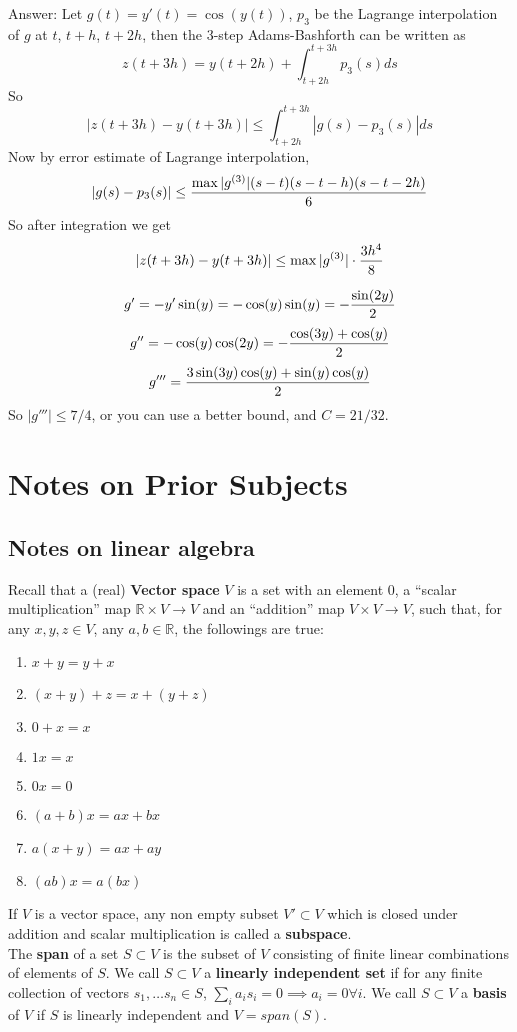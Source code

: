 \documentclass{article} %
\theoremstyle{break}
\begin{document}
Answer: Let $g(t)=y'(t)=\cos(y(t))$, $p_3$ be the Lagrange interpolation of $g$ at $t$, $t+h$, $t+2h$, then the 3-step Adams-Bashforth can be written as
\[z(t+3h)=y(t+2h)+\int_{t+2h}^{t+3h}p_3(s)ds\]
So
\[|z(t+3h)-y(t+3h)|\leq \int_{t+2h}^{t+3h}|g(s)-p_3(s)|ds\]
Now by error estimate of Lagrange interpolation,
\[|g(s)-p_3(s)|\leq{\max|g^{(3)}|(s-t)(s-t-h)(s-t-2h)\over 6}\]
So after integration we get
\[|z(t+3h)-y(t+3h)|\leq \max|g^{(3)}|\cdot{3h^4\over 8}\]

\[g'=-y'\sin(y)=-\cos(y)\sin(y)=-{\sin(2y)\over 2}\]
\[g''=-\cos(y)\cos(2y)=-{\cos(3y)+\cos(y)\over 2}\]
\[g'''={3\sin(3y)\cos(y)+\sin(y)\cos(y)\over 2}\]
So $|g'''|\leq 7/4$, or you can use a better bound, and $C=21/32$.


\section{Notes on Prior Subjects}

\subsection{Notes on linear algebra}

Recall that a (real) {\bf Vector space} $V$ is a set with an element $0$, a ``scalar multiplication'' map $\mathbb{R}\times V\rightarrow V$ and an ``addition'' map $V\times V\rightarrow V$, such that, for any $x, y, z\in V$, any $a, b\in \mathbb{R}$, the followings are true:
\begin{enumerate}
\item $x+y=y+x$
\item $(x+y)+z=x+(y+z)$
\item $0+x=x$
\item $1x=x$
\item $0x=0$
\item $(a+b)x=ax+bx$
\item $a(x+y)=ax+ay$
\item $(ab)x=a(bx)$
\end{enumerate}

If $V$ is a vector space, any non empty subset $V'\subset V$ which is closed under addition and scalar multiplication is called a {\bf subspace}.\\

The {\bf span} of a set $S\subset V$ is the subset of $V$ consisting of finite linear combinations of elements of $S$. We call $S\subset V$ a {\bf linearly independent set} if for any finite collection of vectors $s_1, \dots s_n\in S$, $\sum_ia_is_i=0\implies a_i=0\forall i$. We call $S\subset V$ a {\bf basis} of $V$ if $S$ is linearly independent and $V=span(S)$.\\
\end{document}
